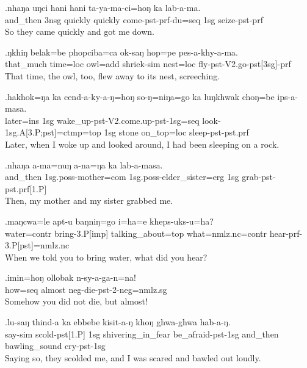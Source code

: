 \exg.nhaŋa   uŋci hani    hani    ta-ya-ma-ci=hoŋ             ka  lab-a-ma.\\
 and\_then {\sc 3nsg}  quickly quickly come{\sc -pst-prf-du=seq} {\sc 1sg} seize{\sc -pst-prf}\\
So they came quickly and got me down.

\exg.ŋkhiŋ   belak=be   phopciba=ca        ok-saŋ          hop=pe     pes-a-khy-a-ma.\\
  that\_much time{\sc =loc} owl{\sc =add} shriek{\sc -sim} nest{\sc =loc} fly{\sc -pst-V2.go-pst[3sg]-prf}\\
That time, the owl, too, flew away to its nest, screeching.

\exg.hakhok=ŋa  ka  cend-a-ky-a-ŋ=hoŋ                             so-ŋ=niŋa=go                       ka  luŋkhwak choŋ=be     ips-a-masa.\\
 later{\sc =ins} {\sc 1sg} wake\_up{\sc -pst-V2.come.up-pst-1sg=seq}  look{\sc -1sg.A[3.P;pst]=ctmp=top} {\sc 1sg} stone     on\_top{\sc =loc} sleep{\sc -pst-pst.prf}\\
Later, when I woke up and looked around, I had been sleeping on a rock.

\exg.nhaŋa   a-ma=nuŋ                a-na=ŋa                      ka  lab-a-masa.\\
 and\_then {\sc 1sg.poss-}mother{\sc =com}  {\sc 1sg.poss-}elder\_sister{\sc =erg} {\sc 1sg} grab{\sc -pst-pst.prf[1.P]}\\
Then, my mother and my sister grabbed me.

\exg.maŋcwa=le          apt-u           baŋniŋ=go          i=ha=e                         kheps-uks-u=ha?\\
 water{\sc =contr} bring{\sc -3.P[imp]} talking\_about{\sc =top} what{\sc =nmlz.nc=contr} hear{\sc -prf-3.P[pst]=nmlz.nc}\\
When we told you to bring water, what did you hear?

\exg.imin=hoŋ   ollobak n-sy-a-ga-n=na!\\
 how{\sc =seq}  almost  {\sc neg-}die{\sc -pst-2-neg=nmlz.sg}\\
Somehow you did not die, but almost!

\exg.lu-saŋ        thind-a          ka  ebbebe            kisit-a-ŋ              khoŋ    ghwa-ghwa     hab-a-ŋ.\\
 say{\sc -sim} scold{\sc -pst[1.P]} {\sc 1sg} shivering\_in\_fear be\_afraid{\sc -pst-1sg} and\_then bawling\_sound cry{\sc -pst-1sg}\\
Saying so, they scolded me, and I was scared and bawled out loudly.

